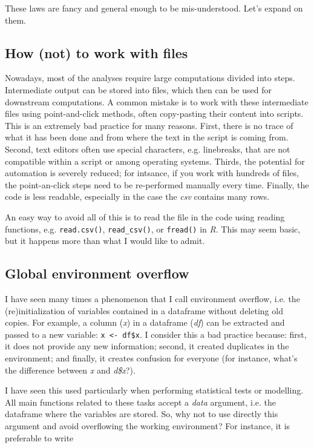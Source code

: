 \documentclass{book}
\begin{document}
These laws are fancy and general enough to be mis-understood. Let's expand on them.

\subsection{How (not) to work with files}

Nowadays, most of the analyses require large computations divided into steps. Intermediate output can be stored into files, which then can be used for downstream computations. A common mistake is to work with these intermediate files using point-and-click methods, often copy-pasting their content into scripts. This is an extremely bad practice for many reasons. First, there is no trace of what it has been done and from where the text in the script is coming from. Second, text editors often use special characters, e.g. linebreaks, that are not compatible within a script or among operating systems. Thirds, the potential for automation is severely reduced; for intsance, if you work with hundreds of files, the point-an-click steps need to be re-performed manually every time. Finally, the code is less readable, especially in the case the \textit{csv} contains many rows. 

An easy way to avoid all of this is to read the file in the code using reading functions, e.g. \texttt{read.csv()}, \texttt{read\_csv()}, or \texttt{fread()} in \textit{R}. This may seem basic, but it happens more than what I would like to admit.

\subsection{Global environment overflow}

I have seen many times a phenomenon that I call environment overflow, i.e. the (re)initialization of variables contained in a dataframe without deleting old copies. For example, a column (\textit{x}) in a dataframe (\textit{df}) can be extracted and passed to a new variable: \lstinline[columns=fixed]{x <- df$x}. I consider this a bad practice because: first, it does not provide any new information; second, it created duplicates in the environment; and finally, it creates confusion for everyone (for instance, what's the difference between \textit{x} and \textit{d\$x}?).

I have seen this used particularly when performing statistical tests or modelling. All main functions related to these tasks accept a \textit{data} argument, i.e. the dataframe where the variables are stored. So, why not to use directly this argument and avoid overflowing the working environment? For instance, it is preferable to write
\end{document}
